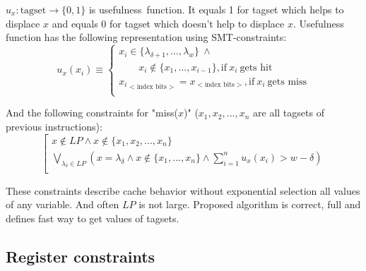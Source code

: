 \documentclass[times, 10pt,twocolumn]{article}
\begin{document}
$u_x: \mbox{tagset} \rightarrow \{0, 1\}$ is \mbox{usefulness
function}. It equals 1 for tagset which helps to displace $x$ and
equals 0 for tagset which doesn't help to displace $x$. Usefulness
function has the following representation using SMT-constraints:
$$u_x(x_i) \equiv \left\{\begin{array}{l}
x_i\in\{\lambda_{\delta+1}, ..., \lambda_w\}~\wedge\\
\qquad x_i\notin\{x_1, ..., x_{i-1}\}, \mbox{if}~x_i~\mbox{gets hit}\\
{x_i}_{<\mbox{index bits}>} = {x}_{<\mbox{index bits}>}, \mbox{if}~x_i~\mbox{gets miss}\\
\end{array}\right.$$

And the following constraints for "miss($x$)" ($x_1, x_2, ..., x_n$
are all tagsets of previous instructions):
$$\left[\begin{array}{l}
x\notin LP \wedge x\notin\{x_1, x_2, ..., x_n\}\\
\bigvee\limits_{\lambda_\delta \in LP} (x = \lambda_\delta \wedge x
\notin \{x_1, ..., x_n\} \wedge
\sum\limits_{i=1}^n u_x(x_i) > w - \delta)\\
\end{array}\right.$$

These constraints describe cache behavior without exponential
selection all values of any variable. And often $LP$ is not large.
Proposed algorithm is correct, full and defines fast way to get
values of tagsets.

\subsection{Register constraints}
\end{document}

